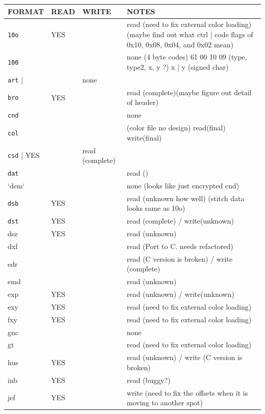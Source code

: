 \documentclass{report}
\begin{document}
\begin{longtable}{l l l p{8cm}}
\textbf{FORMAT} & \textbf{READ} & \textbf{WRITE} & \textbf{NOTES} \\
\hline
\index{10o}\texttt{10o} & YES &  & read (need to fix external color loading) (maybe find out what ctrl | code flags of 0x10, 0x08, 0x04, and 0x02 mean) \\
\index{100}\texttt{100} &  &  & none (4 byte codes) 61 00 10 09 (type, type2, x, y ?) x | y (signed char) \\
\index{art}\texttt{art} |  &  & none \\
\index{bro}\texttt{bro} & YES &  & read (complete)(maybe figure out detail of header) \\
\index{cnd}\texttt{cnd} &  &  & none \\
\index{col}\texttt{col} &  &  & (color file no design) read(final) write(final) \\
\index{csd}\texttt{csd} | YES   &  & read (complete) \\
\index{dat}\texttt{dat} &  &  & read () \\
\index{dem}`dem` &  &  & none (looks like just encrypted cnd) \\
\index{dsb}\texttt{dsb} & YES   &  & read (unknown how well) (stitch data looks same as 10o) \\
\index{dst}\texttt{dst} & YES   &  & read (complete) / write(unknown) \\
\index{dsz}dsz & YES   &  & read (unknown) \\
\index{dxf}dxf &  &  & read (Port to C. needs refactored) \\
\index{edr}edr &  &  & read (C version is broken) / write (complete) \\
\index{emd}emd &  &  & read (unknown) \\
\index{exp}exp & YES   &  & read (unknown) / write(unknown) \\
\index{exy}exy & YES   &  & read (need to fix external color loading) \\
\index{fxy}fxy & YES   &  & read (need to fix external color loading) \\
\index{gnc}gnc &  &  & none \\
\index{gt}gt &  &  & read (need to fix external color loading) \\
\index{hus}hus & YES   &  & read (unknown) / write (C version is broken) \\
\index{inb}inb & YES   &  & read (buggy?) \\
\index{jef}jef & YES   &  & write (need to fix the offsets when it is moving to another spot) \\

\end{longtable}
\end{document}
